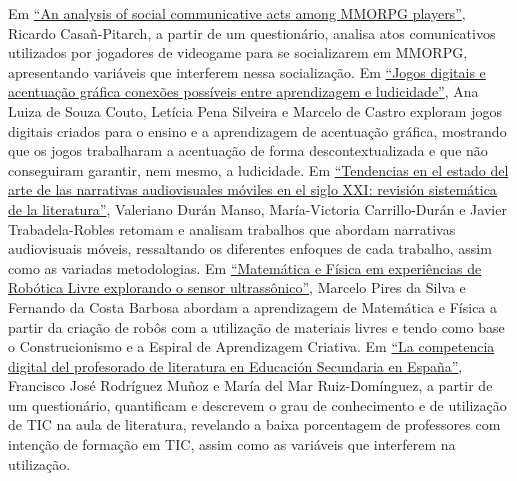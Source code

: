 \documentclass{textolivre}
\begin{document}
Em \href{https://doi.org/10.35699/1983-3652.2021.33890}{“An analysis of social communicative acts among MMORPG players”}, Ricardo Casañ-Pitarch, a partir de um questionário, analisa atos comunicativos utilizados por jogadores de videogame para se socializarem em MMORPG, apresentando variáveis que interferem nessa socialização. Em \href{https://doi.org/10.35699/1983-3652.2021.35333}{“Jogos digitais e acentuação gráfica conexões possíveis entre aprendizagem e ludicidade”}, Ana Luiza de Souza Couto, Letícia Pena Silveira e Marcelo de Castro exploram jogos digitais criados para o ensino e a aprendizagem de acentuação gráfica, mostrando que os jogos trabalharam a acentuação de forma descontextualizada e que não conseguiram garantir, nem mesmo, a ludicidade. Em \href{https://doi.org/10.35699/1983-3652.2021.29457}{“Tendencias en el estado del arte de las narrativas audiovisuales móviles en el siglo XXI: revisión sistemática de la literatura”}, Valeriano Durán Manso, María-Victoria Carrillo-Durán e Javier Trabadela-Robles retomam e analisam trabalhos que abordam narrativas audiovisuais móveis, ressaltando os diferentes enfoques de cada trabalho, assim como as variadas metodologias. Em \href{https://doi.org/10.35699/1983-3652.2021.29629}{“Matemática e Física em experiências de Robótica Livre explorando o sensor ultrassônico”}, Marcelo Pires da Silva e Fernando da Costa Barbosa abordam a aprendizagem de Matemática e Física a partir da criação de robôs com a utilização de materiais livres e tendo como base o Construcionismo e a Espiral de Aprendizagem Criativa. Em \href{https://doi.org/10.35699/1983-3652.2021.31351}{“La competencia digital del profesorado de literatura en Educación Secundaria en España”}, Francisco José Rodríguez Muñoz e María del Mar Ruiz-Domínguez, a partir de um questionário, quantificam e descrevem o grau de conhecimento e de utilização de TIC na aula de literatura, revelando a baixa porcentagem de professores com intenção de formação em TIC, assim como as variáveis que interferem na utilização.
\end{document}
